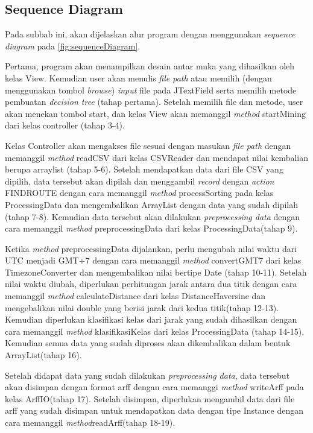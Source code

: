 \subsection{Sequence Diagram}

Pada subbab ini, akan dijelaskan alur program dengan menggunakan \textsl{sequence diagram} pada \ref{fig:sequenceDiagram}.

Pertama, program akan menampilkan desain antar muka yang dihasilkan oleh kelas View. Kemudian user akan menulis \textsl{file path} atau memilih (dengan menggunakan tombol \textsl{browse}) \textsl{input} file pada JTextField serta memilih metode pembuatan \textsl{decision tree} (tahap  pertama). Setelah memilih file dan metode, user akan menekan tombol start, dan kelas View akan memanggil \textsl{method} startMining dari kelas controller (tahap 3-4).

Kelas Controller akan mengakses file sesuai dengan masukan \textsl{file path} dengan memanggil \textsl{method} readCSV dari kelas CSVReader dan mendapat nilai kembalian berupa arraylist (tahap 5-6). Setelah mendapatkan data dari file CSV yang dipilih, data tersebut akan dipilah dan menggambil \textsl{record} dengan \textsl{action} FINDROUTE dengan cara memanggil \textsl{method} processSorting pada kelas ProcessingData dan mengembalikan ArrayList dengan data yang sudah dipilah (tahap 7-8). Kemudian data tersebut akan dilakukan \textsl{preprocessing data} dengan cara memanggil \textsl{method} preprocessingData dari kelas ProcessingData(tahap 9).

Ketika \textsl{method} preprocessingData dijalankan, perlu mengubah nilai waktu dari UTC menjadi GMT+7 dengan cara memanggil \textsl{method} convertGMT7 dari kelas TimezoneConverter dan mengembalikan nilai bertipe Date (tahap 10-11). Setelah nilai waktu diubah, diperlukan perhitungan jarak antara dua titik dengan cara memanggil \textsl{method} calculateDistance  dari kelas DistanceHaversine dan mengebalikan nilai double yang berisi jarak dari kedua titik(tahap 12-13). Kemudian diperlukan klasifikasi kelas dari jarak yang sudah dihasilkan dengan cara memanggil \textsl{method} klasifikasiKelas dari kelas ProcessingData (tahap 14-15). Kemudian semua data yang sudah diproses akan dikembalikan dalam bentuk ArrayList(tahap 16).

Setelah didapat data yang sudah dilakukan \textsl{preprocessing data}, data tersebut akan disimpan dengan format arff dengan cara memanggi \textsl{method} writeArff pada kelas ArffIO(tahap 17). Setelah disimpan, diperlukan mengambil data dari file arff yang sudah disimpan untuk mendapatkan data dengan tipe Instance dengan cara memanggil \textsl{method}readArff(tahap 18-19).

